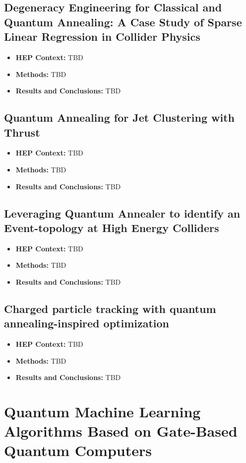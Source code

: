 \subsection{Degeneracy Engineering for Classical and Quantum Annealing: A Case Study of Sparse Linear Regression in Collider Physics~\cite{Anschuetz:2022rwu}}
\begin{itemize}
	\item \textbf{HEP Context: }TBD
	\item \textbf{Methods: }TBD
	\item \textbf{Results and Conclusions: }TBD
\end{itemize}\subsection{Quantum Annealing for Jet Clustering with Thrust~\cite{Delgado:2022snu}}
\begin{itemize}
	\item \textbf{HEP Context: }TBD
	\item \textbf{Methods: }TBD
	\item \textbf{Results and Conclusions: }TBD
\end{itemize}\subsection{Leveraging Quantum Annealer to identify an Event-topology at High Energy Colliders~\cite{Kim:2021wrr}}
\begin{itemize}
	\item \textbf{HEP Context: }TBD
	\item \textbf{Methods: }TBD
	\item \textbf{Results and Conclusions: }TBD
\end{itemize}\subsection{Charged particle tracking with quantum annealing-inspired optimization~\cite{Zlokapa:2019tkn}}
\begin{itemize}
	\item \textbf{HEP Context: }TBD
	\item \textbf{Methods: }TBD
	\item \textbf{Results and Conclusions: }TBD
\end{itemize}

\section{Quantum Machine Learning Algorithms Based on Gate-Based Quantum Computers}

